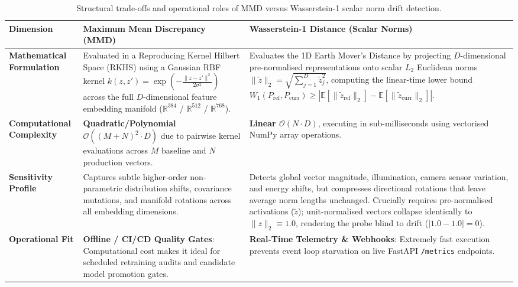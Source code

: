 \begin{table}[htbp]
\centering
\small
\begin{tabularx}{\textwidth}{@{}lXX@{}}
\toprule
\textbf{Dimension} & \textbf{Maximum Mean Discrepancy (MMD)} & \textbf{Wasserstein-1 Distance (Scalar Norms)} \\
\midrule
\textbf{Mathematical Formulation} & 
Evaluated in a Reproducing Kernel Hilbert Space (RKHS) using a Gaussian RBF kernel $k(z, z') = \exp\left(-\frac{\|z - z'\|^2}{2\sigma^2}\right)$ across the full $D$-dimensional feature embedding manifold ($\mathbb{R}^{384}$ / $\mathbb{R}^{512}$ / $\mathbb{R}^{768}$). & 
Evaluates the 1D Earth Mover's Distance by projecting $D$-dimensional pre-normalised representations onto scalar $L_2$ Euclidean norms $\|\tilde{z}\|_2 = \sqrt{\sum_{j=1}^D \tilde{z}_j^2}$, computing the linear-time lower bound $W_1(P_{\text{ref}}, P_{\text{curr}}) \ge \left| \mathbb{E}[\|\tilde{z}_{\text{ref}}\|_2] - \mathbb{E}[\|\tilde{z}_{\text{curr}}\|_2] \right|$. \\
\addlinespace
\textbf{Computational Complexity} & 
\textbf{Quadratic/Polynomial $\mathcal{O}((M+N)^2 \cdot D)$} due to pairwise kernel evaluations across $M$ baseline and $N$ production vectors. & 
\textbf{Linear $\mathcal{O}(N \cdot D)$}, executing in sub-milliseconds using vectorised NumPy array operations. \\
\addlinespace
\textbf{Sensitivity Profile} & 
Captures subtle higher-order non-parametric distribution shifts, covariance mutations, and manifold rotations across all embedding dimensions. & 
Detects global vector magnitude, illumination, camera sensor variation, and energy shifts, but compresses directional rotations that leave average norm lengths unchanged. Crucially requires pre-normalised activations ($\tilde{z}$); unit-normalised vectors collapse identically to $\|z\|_2 \equiv 1.0$, rendering the probe blind to drift ($|1.0 - 1.0| = 0$). \\
\addlinespace
\textbf{Operational Fit} & 
\textbf{Offline / CI/CD Quality Gates}: Computational cost makes it ideal for scheduled retraining audits and candidate model promotion gates. & 
\textbf{Real-Time Telemetry \& Webhooks}: Extremely fast execution prevents event loop starvation on live FastAPI \texttt{/metrics} endpoints. \\
\bottomrule
\end{tabularx}
\caption{Structural trade-offs and operational roles of MMD versus Wasserstein-1 scalar norm drift detection.}
\label{tab:drift_metric_comparison}
\end{table}

